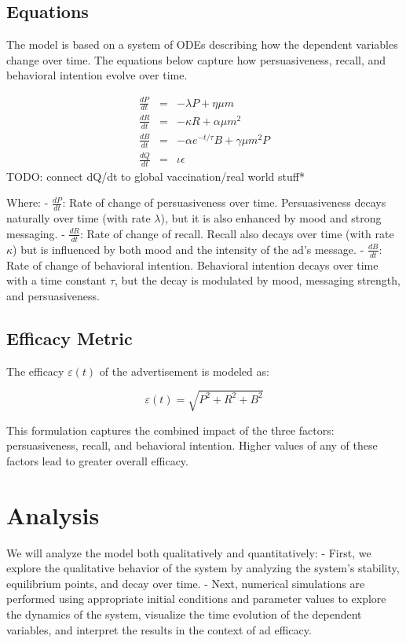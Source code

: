 \documentclass[12pt,a4paper]{article}
\begin{document}
\subsection{Equations}
The model is based on a system of ODEs describing how the dependent variables change over time. The equations below capture how persuasiveness, recall, and behavioral intention evolve over time.

\begin{eqnarray}
\frac{dP}{dt} &=& -\lambda P + \eta \mu m \\
\frac{dR}{dt} &=& -\kappa R + \alpha \mu m^2 \\
\frac{dB}{dt} &=& -\alpha e^{-t/\tau} B + \gamma \mu m^2 P \\
\frac{dQ}{dt} &=& \iota \epsilon
\end{eqnarray}
TODO: connect dQ/dt to global vaccination/real world stuff*

Where:
- \( \frac{dP}{dt} \): Rate of change of persuasiveness over time. Persuasiveness decays naturally over time (with rate \( \lambda \)), but it is also enhanced by mood and strong messaging.
- \( \frac{dR}{dt} \): Rate of change of recall. Recall also decays over time (with rate \( \kappa \)) but is influenced by both mood and the intensity of the ad's message.
- \( \frac{dB}{dt} \): Rate of change of behavioral intention. Behavioral intention decays over time with a time constant \( \tau \), but the decay is modulated by mood, messaging strength, and persuasiveness.

\subsection{Efficacy Metric}
The efficacy \( \varepsilon(t) \) of the advertisement is modeled as:

\[
\varepsilon(t) = \sqrt{P^2 + R^2 + B^2}
\]

This formulation captures the combined impact of the three factors: persuasiveness, recall, and behavioral intention. Higher values of any of these factors lead to greater overall efficacy.

\section{Analysis}
We will analyze the model both qualitatively and quantitatively:
- First, we explore the qualitative behavior of the system by analyzing the system's stability, equilibrium points, and decay over time.
- Next, numerical simulations are performed using appropriate initial conditions and parameter values to explore the dynamics of the system, visualize the time evolution of the dependent variables, and interpret the results in the context of ad efficacy.
\end{document}
